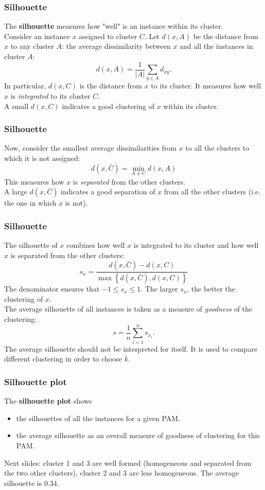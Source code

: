 \begin{frame}
\frametitle{Silhouette}
The {\bf silhouette} measures how "well" is an instance within its cluster. \\
\vspace{0.3cm}
Consider an instance $x$ assigned to cluster $C$. Let $d(x,A)$ be the distance from $x$ to any cluster $A$: the average dissimilarity between $x$ and all the instances in cluster $A$:
$$
d(x,A) = \frac{1}{|A|} \sum_{y\in A} d_{xy}.
$$
In particular, $d(x, C)$ is the distance from $x$ to its cluster. It measures how well $x$ is {\it integrated} to its cluster $C$.\\
\vspace{0.3cm}
A small $d(x,C)$ indicates a good clustering of $x$ within its cluster.
\end{frame}
\begin{frame}
\frametitle{Silhouette}
Now, consider the smallest average dissimilarities from $x$ to all the clusters to which it is not assigned:
$$
d(x,\bar{C}) = \min_{A\neq C} d(x, A)
$$
This measures how $x$ is {\it separated} from the other clusters.\\
\vspace{0.3cm}
A large $d(x,\bar{C})$ indicates a good separation of $x$ from all the other clusters (i.e. the one in which $x$ is not).
\end{frame}
\begin{frame}
\frametitle{Silhouette}
The silhouette of $x$ combines how well $x$ is integrated to its cluster and how well $x$ is separated from the other clusters:
$$
s_x=\frac{d(x,\bar{C})-d(x,C)}{\max\left\{d(x,\bar{C}),d(x,C)\right\}}
$$
The denominator ensures that $-1\leq s_x\leq 1$. The larger $s_x$, the better the clustering of $x$.\\
\vspace{0.3cm}
The average silhouette of all instances is taken as a measure of {\it goodness} of the clustering:
$$
s = \frac{1}{n}\sum_{i=1}^n s_{x_i}.
$$
The average silhouette should not be interpreted for itself. It is used to compare different clustering in order to choose $k$.
\end{frame}
\begin{frame}
\frametitle{Silhouette plot}
The {\bf silhouette plot} shows
\begin{itemize}
\item the silhouettes of all the instances for a given PAM.
\item the average silhouette as an overall measure of goodness of clustering for this PAM.
\end{itemize}
Next slides: cluster 1 and 3 are well formed (homogeneous and separated from the two other clusters), cluster 2 and 3 are less homogeneous. The average silhouette is 0.34.
\end{frame}
